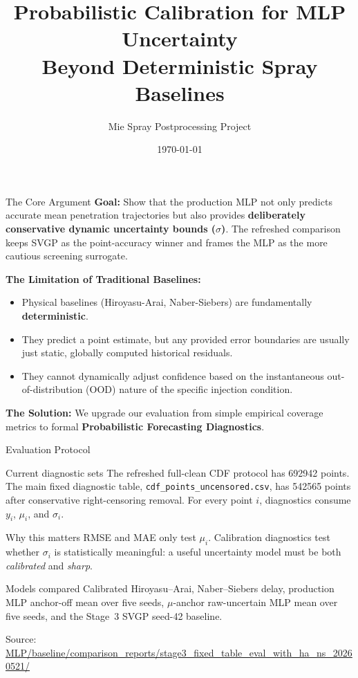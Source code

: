 \documentclass[UTF8,aspectratio=169]{ctexbeamer}
\title[MLP Probabilistic Calibration]{Probabilistic Calibration for MLP Uncertainty\\ \small Beyond Deterministic Spray Baselines}
\author{Mie Spray Postprocessing Project}
\date{\today}
\newcommand{\src}[1]{\vfill{\tiny\textcolor{gray!75!black}{Source: \url{#1}}}}
\begin{document}
\begin{frame}
  \titlepage
\end{frame}

\begin{frame}{The Core Argument}
\textbf{Goal:}
Show that the production MLP not only predicts accurate mean penetration trajectories
but also provides \textbf{deliberately conservative dynamic uncertainty bounds ($\sigma$)}.
The refreshed comparison keeps SVGP as the point-accuracy winner and frames the MLP
as the more cautious screening surrogate.

\vspace{0.5em}
\textbf{The Limitation of Traditional Baselines:}
\begin{itemize}
    \item Physical baselines (Hiroyasu-Arai, Naber-Siebers) are fundamentally \textbf{deterministic}.
    \item They predict a point estimate, but any provided error boundaries are usually just static, globally computed historical residuals.
    \item They cannot dynamically adjust confidence based on the instantaneous out-of-distribution (OOD) nature of the specific injection condition.
\end{itemize}

\vspace{0.5em}
\textbf{The Solution:} We upgrade our evaluation from simple empirical coverage metrics to formal \textbf{Probabilistic Forecasting Diagnostics}.
\end{frame}

\begin{frame}{Evaluation Protocol}
\small
\begin{block}{Current diagnostic sets}
The refreshed full-clean CDF protocol has \num{692942} points. The main fixed
diagnostic table, \texttt{cdf\_points\_uncensored.csv}, has \num{542565} points
after conservative right-censoring removal. For every point \(i\), diagnostics
consume \(y_i\), \(\mu_i\), and \(\sigma_i\).
\end{block}

\begin{block}{Why this matters}
RMSE and MAE only test \(\mu_i\). Calibration diagnostics test whether
\(\sigma_i\) is statistically meaningful: a useful uncertainty model must be
both \emph{calibrated} and \emph{sharp}.
\end{block}

\begin{block}{Models compared}
Calibrated Hiroyasu--Arai, Naber--Siebers delay, production MLP anchor-off
mean over five seeds, \(\mu\)-anchor raw-uncertain MLP mean over five seeds,
and the Stage~3 SVGP seed-42 baseline.
\end{block}

\src{MLP/baseline/comparison_reports/stage3_fixed_table_eval_with_ha_ns_20260521/}
\end{frame}
\end{document}
